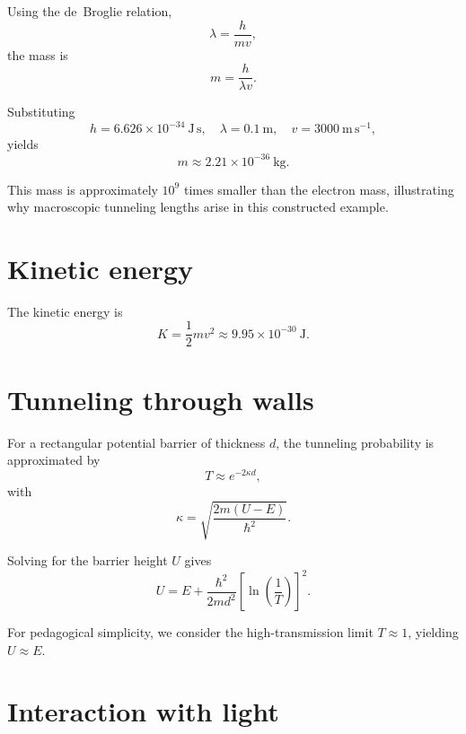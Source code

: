 \documentclass[aps,prper,twocolumn,superscriptaddress]{revtex4-2}
\begin{document}
Using the de~Broglie relation,\cite{SakuraiQM}
\begin{equation}
\lambda = \frac{h}{mv},
\end{equation}
the mass is
\begin{equation}
m = \frac{h}{\lambda v}.
\end{equation}

Substituting
\begin{equation}
h = 6.626\times10^{-34}~\mathrm{J\,s}, \quad
\lambda = 0.1~\mathrm{m}, \quad
v = 3000~\mathrm{m\,s^{-1}},
\end{equation}
yields
\begin{equation}
m \approx 2.21\times10^{-36}~\mathrm{kg}.
\end{equation}

This mass is approximately $10^{9}$ times smaller than the electron mass,\cite{HallidayResnick} illustrating why macroscopic tunneling lengths arise in this constructed example.

\section{Kinetic energy}

The kinetic energy is
\begin{equation}
K = \frac{1}{2}mv^2 \approx 9.95\times10^{-30}~\mathrm{J}.
\end{equation}

\section{Tunneling through walls}

For a rectangular potential barrier of thickness $d$, the tunneling probability is approximated by\cite{GriffithsQM}
\begin{equation}
T \approx e^{-2\kappa d},
\end{equation}
with
\begin{equation}
\kappa = \sqrt{\frac{2m(U-E)}{\hbar^2}}.
\end{equation}

Solving for the barrier height $U$ gives
\begin{equation}
U = E + \frac{\hbar^2}{2md^2}\left[\ln\left(\frac{1}{T}\right)\right]^2.
\end{equation}

For pedagogical simplicity, we consider the high-transmission limit $T\approx1$, yielding $U\approx E$.

\section{Interaction with light}
\end{document}
